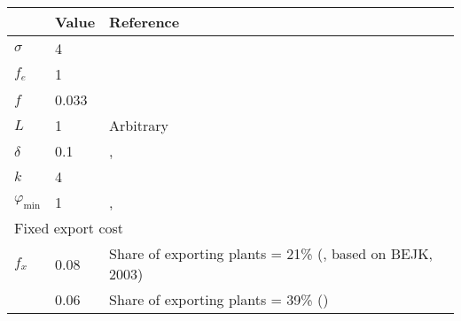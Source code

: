 \begin{tabular}{lll}
& Value & Reference\\
\hline
$\sigma$ & 4 & \cite{Irrazabal_2015}\\
$f_e$ & 1 & \cite{ghironi}\\
$f$ & 0.033 & \cite{ghironi} \\
$L$ & 1 & Arbitrary\\
$\delta$ & 0.1 & \cite{ghironi}, \cite{Irrazabal_2015}\\
$k$ & 4 \\
$\varphi_{\text{min}}$ & 1 & \cite{ghironi}, \cite{Irrazabal_2015}\\ \hline
\multicolumn{3}{l}{Fixed export cost } \\
$f_x $ & 0.08 & Share of exporting plants = 21\% (\cite{ghironi}, based on BEJK, 2003) \\
& 0.06& Share of exporting plants = 39\% (\cite{Lincoln_McCallum2018}) \\
\hline
\end{tabular} 